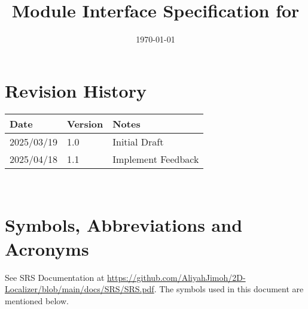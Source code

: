 \documentclass[12pt, titlepage]{article}
\begin{document}
\title{Module Interface Specification for \progname{}}

\author{\authname}

\date{\today}

\maketitle


\section{Revision History}

\begin{tabularx}{\textwidth}{p{3cm}p{2cm}X}
\toprule {\bf Date} & {\bf Version} & {\bf Notes}\\
\midrule
2025/03/19 & 1.0 & Initial Draft\\
2025/04/18 & 1.1 & Implement Feedback\\
\bottomrule
\end{tabularx}

~\newpage

\section{Symbols, Abbreviations and Acronyms}

See SRS Documentation at \url{https://github.com/AliyahJimoh/2D-Localizer/blob/main/docs/SRS/SRS.pdf}. The symbols used in this document are mentioned below.
\end{document}
